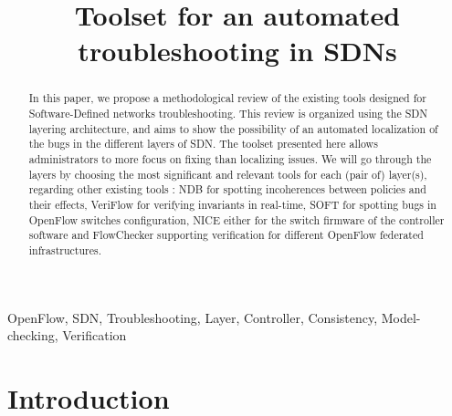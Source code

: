 \documentclass[10pt,article]{IEEEtran}
\begin{document}
\title{Toolset for an automated troubleshooting in SDNs}

\author{
}


\maketitle
\begin{abstract}
In this paper, we propose a methodological review of the existing tools designed for Software-Defined networks troubleshooting. This review is organized using the SDN layering architecture, and aims to show the possibility of an automated localization of the bugs in the different layers of SDN. The toolset presented here allows administrators to more focus on fixing than localizing issues. We will go through the layers by choosing the most significant and relevant tools for each (pair of) layer(s), regarding other existing tools : NDB for spotting incoherences between policies and their effects, VeriFlow for verifying invariants in real-time, SOFT for spotting bugs in OpenFlow switches configuration, NICE either for the switch firmware of the controller software and FlowChecker supporting verification for different OpenFlow federated infrastructures.
\end{abstract}

\begin{IEEEkeywords}
OpenFlow, SDN, Troubleshooting, Layer, Controller, Consistency, Model-checking, Verification
\end{IEEEkeywords}

\section{Introduction}
\end{document}
